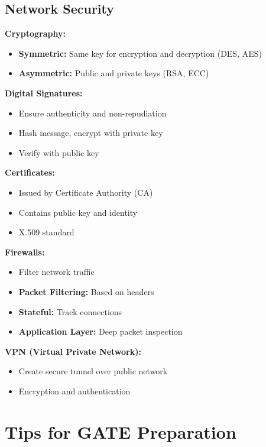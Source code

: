 \documentclass[11pt,a4paper]{article}
\begin{document}
\subsection{Network Security}

\textbf{Cryptography:}
\begin{itemize}
    \item \textbf{Symmetric:} Same key for encryption and decryption (DES, AES)
    \item \textbf{Asymmetric:} Public and private keys (RSA, ECC)
\end{itemize}

\textbf{Digital Signatures:}
\begin{itemize}
    \item Ensure authenticity and non-repudiation
    \item Hash message, encrypt with private key
    \item Verify with public key
\end{itemize}

\textbf{Certificates:}
\begin{itemize}
    \item Issued by Certificate Authority (CA)
    \item Contains public key and identity
    \item X.509 standard
\end{itemize}

\textbf{Firewalls:}
\begin{itemize}
    \item Filter network traffic
    \item \textbf{Packet Filtering:} Based on headers
    \item \textbf{Stateful:} Track connections
    \item \textbf{Application Layer:} Deep packet inspection
\end{itemize}

\textbf{VPN (Virtual Private Network):}
\begin{itemize}
    \item Create secure tunnel over public network
    \item Encryption and authentication
\end{itemize}


\section{Tips for GATE Preparation}
\end{document}
